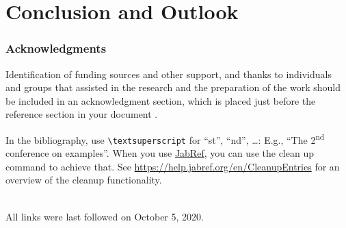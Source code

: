 \documentclass[runningheads,a4paper,english]{llncs}[2022/01/12]
\begin{document}
\section{Conclusion and Outlook}
\label{sec:outlook}
\lipsum[1-2]

\subsubsection*{Acknowledgments}

Identification of funding sources and other support, and thanks to individuals and groups that assisted in the research and the preparation of the work should be included in an acknowledgment section, which is placed just before the reference section in your document \cite{acmart}.


In the bibliography, use \texttt{\textbackslash textsuperscript} for \enquote{st}, \enquote{nd}, \ldots:
E.g., \enquote{The 2\textsuperscript{nd} conference on examples}.
When you use \href{https://www.jabref.org}{JabRef}, you can use the clean up command to achieve that.
See \url{https://help.jabref.org/en/CleanupEntries} for an overview of the cleanup functionality.

\renewcommand{\bibsection}{\section*{References}} %

\begingroup
  \small %
  
\endgroup

\ \\
%
All links were last followed on October 5, 2020.



\end{document}
